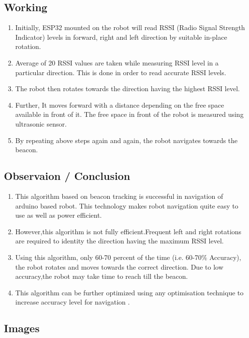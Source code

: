 \documentclass[journal,12pt,twocolumn]{IEEEtran}
\begin{document}
\subsection{\textbf{Working}}
\begin{enumerate}
    \item Initially, ESP32 mounted on the robot will read RSSI (Radio Signal Strength Indicator) levels in forward, right and left direction by suitable in-place rotation.
    \item Average of 20 RSSI values are taken while measuring RSSI level in a particular direction. This is done in order to read accurate RSSI levels.
    \item The robot then rotates towards the direction having the highest RSSI level.
    \item Further, It moves forward with a distance depending on the free space available in front of it. The free space in front of the robot is measured using ultrasonic sensor.
    \item By repeating above steps again and again, the robot navigates towards the beacon.
\end{enumerate}
\subsection{\textbf{Observaion / Conclusion}}
\begin{enumerate}
    \item This algorithm based on beacon tracking is successful in navigation of arduino based robot. This technology makes robot navigation quite easy to use as well as power efficient.
    \item However,this algorithm is not fully efficient.Frequent left and right rotations are required to identity the direction having the maximum RSSI level.
    \item Using this algorithm, only 60-70 percent of the time (i.e. 60-70\% Accuracy), the robot rotates and moves towards the correct direction. Due to low accuracy,the robot may take time to reach till the beacon. 
    \item This algorithm can be further optimized using any optimisation technique to increase accuracy level for navigation .
\end{enumerate}

\newpage
\subsection{\textbf{Images}}
\end{document}
